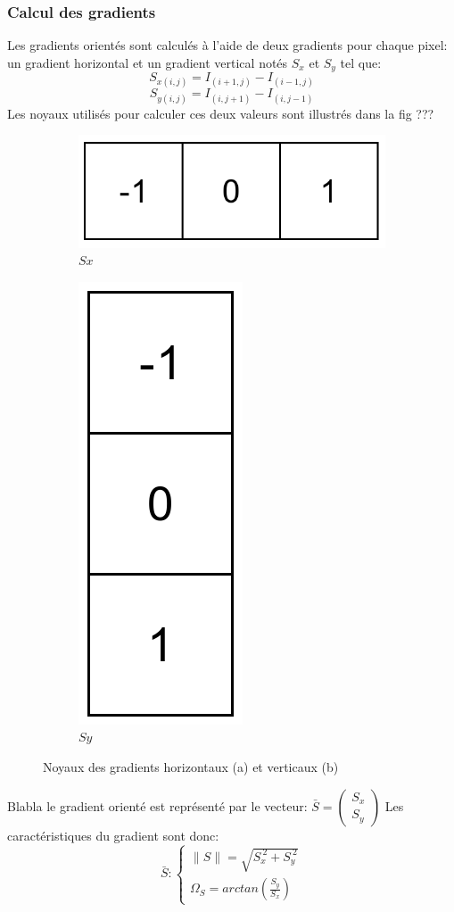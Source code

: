 \documentclass[12pt]{article}
\begin{document}
\subsubsection{Calcul des gradients}
Les gradients orientés sont calculés à l'aide de deux gradients pour chaque pixel: un gradient horizontal et un gradient vertical notés $S_{x}$ et $S_{y}$ tel que:
\[S_{x(i,j)}=I_{(i+1,j)}-I_{(i-1,j)}\]
\[S_{y(i,j)}=I_{(i,j+1)}-I_{(i,j-1)}\]
Les noyaux utilisés pour calculer ces deux valeurs sont illustrés dans la fig ???
\begin{figure}[!ht]
\centering
\begin{subfigure}{.3\textwidth}
  \centering
  \includegraphics[width=.45\linewidth]{img/Sx.png}
  \caption{$Sx$}
  \label{fig:kernel_sx}
\end{subfigure}
\begin{subfigure}{.3\textwidth}
  \centering
  \includegraphics[width=.15\linewidth]{img/Sy.png}
  \caption{$Sy$}
  \label{fig:kernel_sy}
\end{subfigure}
\caption{Noyaux des gradients horizontaux (a) et verticaux (b)}
\label{fig:kernels}
\end{figure}
Blabla le gradient orienté est représenté par le vecteur: 
$\bar{S}=\begin{pmatrix}S_{x}\\S_{y}\end{pmatrix}$
Les caractéristiques du gradient sont donc:
\[\bar{S}:\begin{cases}
\|S\|=\sqrt{S_{x}^{~2}+S_{y}^{~2}}\\
\Omega_{S} = arctan(\frac{S_{y}}{S_{x}})
\end{cases}\]
\end{document}
